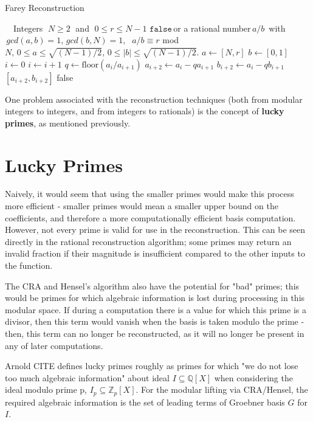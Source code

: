 \documentclass[letterpaper,12pt,titlepage,oneside,final]{book}
\newcommand\abs[1]{\left|#1\right|}
\begin{document}
\begin{algorithm}[H]
\caption{Farey Reconstruction}\label{farey}
\begin{algorithmic}[1]
\Input $\quad$Integers $\; N \geq 2 \;$ and $\; 0 \leq r \leq N - 1$
\Output $\texttt{false} \,$or a rational number$\, a/b \,$ with$\, gcd(a, b) = 1,\, gcd(b, N) = 1,$ $\; a/b \equiv r $ mod $ N, \, 0 \leq a \leq \sqrt{(N-1)/2}, \, 0 \leq \abs{b} \leq \sqrt{(N-1)/2}.$ 
\State $a \gets [ N, r]$
\State $b \gets [ 0, 1]$
\State $i \gets 0$
  \State $i \gets i + 1$
  \State $q \gets \text{floor}( a_i / a_{i+1})$
  \State $a_{i+2} \gets a_i - qa_{i+1}$
  \State $b_{i+2} \gets a_i - qb_{i+1}$
\EndWhile\\  
  \State \quad \Return $[ a_{i+2}, b_{i+2}]$
\Else 
  \State \quad \Return false
\EndIf
\EndProcedure
\end{algorithmic}
\end{algorithm}

One problem associated with the reconstruction techniques (both from modular integers to integers, and from integers to rationals) is the concept of \textbf{lucky primes}, as mentioned previously.    

\section{Lucky Primes}

Naively, it would seem that using the smaller primes would make this process more efficient - smaller primes would mean a smaller upper bound on the coefficients, and therefore a more computationally efficient basis computation.  However, not every prime is valid for use in the reconstruction.  This can be seen directly in the rational reconstruction algorithm; some primes may return an invalid fraction if their magnitude is insufficient compared to the other inputs to the function.  

The CRA and Hensel's algorithm also have the potential for "bad" primes; this would be primes for which algebraic information is lost during processing in this modular space.  If during a computation there is a value for which this prime is a divisor, then this term would vanish when the basis is taken modulo the prime - then, this term can no longer be reconstructed, as it will no longer be present in any of later computations.

Arnold CITE defines lucky primes roughly as primes for which "we do not lose too much algebraic information" about ideal ${I \subseteq \mathbb{Q}[X]}$ when considering the ideal modulo prime p, ${I_p \subseteq \mathbb{Z}_p[X]}$.  For the modular lifting via CRA/Hensel, the required algebraic information is the set of leading terms of Groebner basis ${G}$ for ${I}$.
\end{document}
